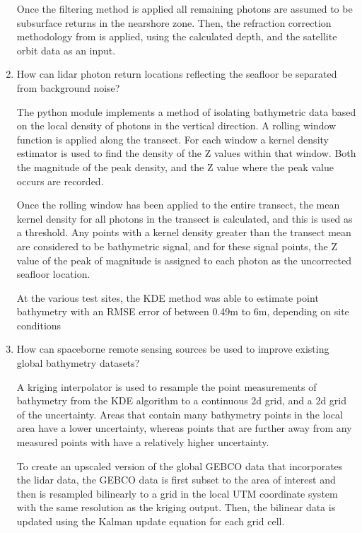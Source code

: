 \begin{enumerate}
    Once the filtering method is applied all remaining photons are assumed to be subsurface returns in the nearshore zone. Then, the refraction correction methodology from \citeauthor{Parrish2019} is applied, using the calculated depth, and the satellite orbit data as an input.


    \item How can lidar photon return locations reflecting the seafloor be separated from background noise?
    
    The python module implements a method of isolating bathymetric data based on the local density of photons in the vertical direction. A rolling window function is applied along the transect. For each window a kernel density estimator is used to find the density of the Z values within that window. Both the magnitude of the peak density, and the Z value where the peak value occurs are recorded.    

    Once the rolling window has been applied to the entire transect, the mean kernel density for all photons in the transect is calculated, and this is used as a threshold. Any points with a kernel density greater than the transect mean are considered to be bathymetric signal, and for these signal points, the Z value of the peak of magnitude is assigned to each photon as the uncorrected seafloor location. 

    At the various test sites, the KDE method was able to estimate point bathymetry with an RMSE error of between 0.49m to 6m, depending on site conditions

    \item How can spaceborne remote sensing sources be used to improve existing global bathymetry datasets?
    
    A kriging interpolator is used to resample the point measurements of bathymetry from the KDE algorithm to a continuous 2d grid, and a 2d grid of the uncertainty. Areas that contain many bathymetry points in the local area have a lower uncertainty, whereas points that are further away from any measured points with have a relatively higher uncertainty.

    To create an upscaled version of the global GEBCO data that incorporates the lidar data, the GEBCO data is first subset to the area of interest and then is resampled bilinearly to a grid in the local UTM coordinate system with the same resolution as the kriging output. Then, the bilinear data is updated using the Kalman update equation for each grid cell. 


\end{enumerate}
